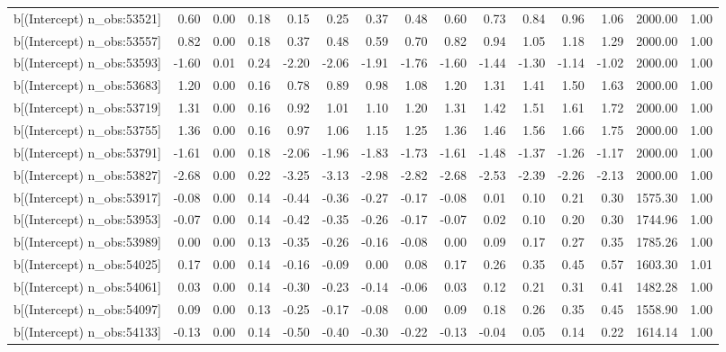 \begin{table}[ht]
\begin{tabular}{rrrrrrrrrrrrrrr}
  b[(Intercept) n\_obs:53521] & 0.60 & 0.00 & 0.18 & 0.15 & 0.25 & 0.37 & 0.48 & 0.60 & 0.73 & 0.84 & 0.96 & 1.06 & 2000.00 & 1.00 \\ 
  b[(Intercept) n\_obs:53557] & 0.82 & 0.00 & 0.18 & 0.37 & 0.48 & 0.59 & 0.70 & 0.82 & 0.94 & 1.05 & 1.18 & 1.29 & 2000.00 & 1.00 \\ 
  b[(Intercept) n\_obs:53593] & -1.60 & 0.01 & 0.24 & -2.20 & -2.06 & -1.91 & -1.76 & -1.60 & -1.44 & -1.30 & -1.14 & -1.02 & 2000.00 & 1.00 \\ 
  b[(Intercept) n\_obs:53683] & 1.20 & 0.00 & 0.16 & 0.78 & 0.89 & 0.98 & 1.08 & 1.20 & 1.31 & 1.41 & 1.50 & 1.63 & 2000.00 & 1.00 \\ 
  b[(Intercept) n\_obs:53719] & 1.31 & 0.00 & 0.16 & 0.92 & 1.01 & 1.10 & 1.20 & 1.31 & 1.42 & 1.51 & 1.61 & 1.72 & 2000.00 & 1.00 \\ 
  b[(Intercept) n\_obs:53755] & 1.36 & 0.00 & 0.16 & 0.97 & 1.06 & 1.15 & 1.25 & 1.36 & 1.46 & 1.56 & 1.66 & 1.75 & 2000.00 & 1.00 \\ 
  b[(Intercept) n\_obs:53791] & -1.61 & 0.00 & 0.18 & -2.06 & -1.96 & -1.83 & -1.73 & -1.61 & -1.48 & -1.37 & -1.26 & -1.17 & 2000.00 & 1.00 \\ 
  b[(Intercept) n\_obs:53827] & -2.68 & 0.00 & 0.22 & -3.25 & -3.13 & -2.98 & -2.82 & -2.68 & -2.53 & -2.39 & -2.26 & -2.13 & 2000.00 & 1.00 \\ 
  b[(Intercept) n\_obs:53917] & -0.08 & 0.00 & 0.14 & -0.44 & -0.36 & -0.27 & -0.17 & -0.08 & 0.01 & 0.10 & 0.21 & 0.30 & 1575.30 & 1.00 \\ 
  b[(Intercept) n\_obs:53953] & -0.07 & 0.00 & 0.14 & -0.42 & -0.35 & -0.26 & -0.17 & -0.07 & 0.02 & 0.10 & 0.20 & 0.30 & 1744.96 & 1.00 \\ 
  b[(Intercept) n\_obs:53989] & 0.00 & 0.00 & 0.13 & -0.35 & -0.26 & -0.16 & -0.08 & 0.00 & 0.09 & 0.17 & 0.27 & 0.35 & 1785.26 & 1.00 \\ 
  b[(Intercept) n\_obs:54025] & 0.17 & 0.00 & 0.14 & -0.16 & -0.09 & 0.00 & 0.08 & 0.17 & 0.26 & 0.35 & 0.45 & 0.57 & 1603.30 & 1.01 \\ 
  b[(Intercept) n\_obs:54061] & 0.03 & 0.00 & 0.14 & -0.30 & -0.23 & -0.14 & -0.06 & 0.03 & 0.12 & 0.21 & 0.31 & 0.41 & 1482.28 & 1.00 \\ 
  b[(Intercept) n\_obs:54097] & 0.09 & 0.00 & 0.13 & -0.25 & -0.17 & -0.08 & 0.00 & 0.09 & 0.18 & 0.26 & 0.35 & 0.45 & 1558.90 & 1.00 \\ 
  b[(Intercept) n\_obs:54133] & -0.13 & 0.00 & 0.14 & -0.50 & -0.40 & -0.30 & -0.22 & -0.13 & -0.04 & 0.05 & 0.14 & 0.22 & 1614.14 & 1.00 \\ 

\end{tabular}
\end{table}
